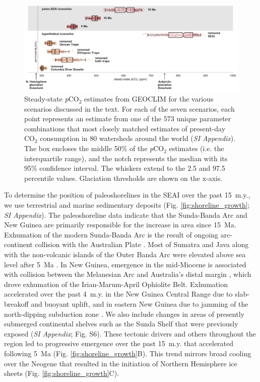 \documentclass[9pt,twocolumn,twoside,lineno]{pnas-new}
\newcommand{\pCOtwo}{\textit{p}CO$_{2}$\xspace}
\newcommand{\COtwo}{CO$_{2}$\xspace}
\newcommand{\SI}{\textit{SI Appendix}\xspace}
\begin{document}
\begin{figure}[h]
    \centering
    \includegraphics[width=1\linewidth]{Figures/scenario_pCO2.pdf}
    \caption{Steady-state \pCOtwo estimates from GEOCLIM for the various scenarios discussed in the text. For each of the seven scenarios, each point represents an estimate from one of the 573 unique parameter combinations that most closely matched estimates of present-day \COtwo consumption in 80 watersheds around the world (\SI). The box encloses the middle 50\% of the \pCOtwo estimates (i.e. the interquartile range), and the notch represents the median with its 95\% confidence interval. The whiskers extend to the 2.5 and 97.5 percentile values. Glaciation thresholds \cite{DeConto2008a} are shown on the x-axis.}
    \label{fig:scenario_pCO2}
\end{figure}

To determine the position of paleoshorelines in the SEAI over the past 15~m.y., we use terrestrial and marine sedimentary deposits (Fig. \ref{fig:shoreline_growth}; \SI). The paleoshoreline data indicate that the Sunda-Banda Arc and New Guinea are primarily responsible for the increase in area since 15~Ma. Exhumation of the modern Sunda-Banda Arc is the result of ongoing arc-continent collision with the Australian Plate \cite{Harris2006a}. Most of Sumatra and Java along with the non-volcanic islands of the Outer Banda Arc were elevated above sea level after 5~Ma \cite{Hall2013b}. In New Guinea, emergence in the mid-Miocene is associated with collision between the Melanesian Arc and Australia's distal margin \cite{Cloos2005a}, which drove exhumation of the Irian-Marum-April Ophiolite Belt. Exhumation accelerated over the past 4~m.y. in the New Guinea Central Range due to slab-breakoff and buoyant uplift, and in eastern New Guinea due to jamming of the north-dipping subduction zone \cite{Cloos2005a}. We also include changes in areas of presently submerged continental shelves such as the Sunda Shelf that were previously exposed (\SI; Fig. S6). These tectonic drivers and others throughout the region led to progressive emergence over the past 15~m.y. that accelerated following 5~Ma (Fig. \ref{fig:shoreline_growth}B). This trend mirrors broad cooling over the Neogene that resulted in the initiation of Northern Hemisphere ice sheets (Fig. \ref{fig:shoreline_growth}C).
\end{document}
